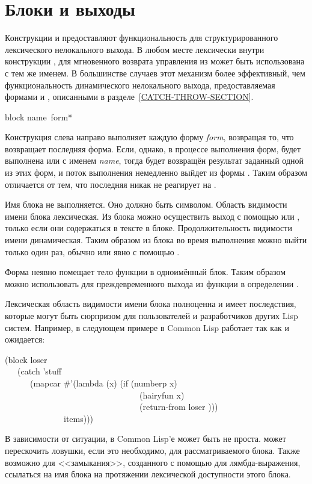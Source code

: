 \section{Блоки и выходы}
\label{BLOCK-RETURN-SECTION}

Конструкции  и  предоставляют функциональность для
структурированного лексического нелокального выхода. В любом месте лексически
внутри конструкции , для мгновенного возврата управления из
 может быть использована  с тем же именем.
В большинстве случаев этот механизм более эффективный, чем функциональность
динамического нелокального выхода, предоставляемая формами  и
, описанными в разделе~\ref{CATCH-THROW-SECTION}.

\begin{defspec}
block name {\,form}*

Конструкция  слева направо выполняет каждую форму \emph{form},
возвращая то, что возвращает последняя форма.
Если, однако, в процессе выполнения форм, будет выполнена  или
 с именем \emph{name}, тогда будет возвращён результат заданный
одной из этих форм, и поток выполнения немедленно выйдет из формы .
Таким образом  отличается от  тем, что последняя никак не
реагирует на .

Имя блока не выполняется. Оно должно быть символом.
Область видимости имени блока лексическая. Из блока можно осуществить выход с
помощью  или , только если они содержаться в тексте
в блоке. Продолжительность видимости имени динамическая.
Таким образом из блока во время выполнения можно выйти только один раз, обычно
или явно с помощью .

Форма  неявно помещает тело функции в одноимённый блок. 
Таким образом можно использовать  для преждевременного выхода
из функции в определении .

Лексическая область видимости имени блока полноценна и имеет последствия,
которые могут быть сюрпризом для пользователей и разработчиков других Lisp
систем.
Например,  в следующем примере в Common Lisp работает так как
и ожидается:
\begin{lisp}
(block loser \\
~~~(catch 'stuff \\
~~~~~~(mapcar \#'(lambda (x) (if (numberp x) \\
~~~~~~~~~~~~~~~~~~~~~~~~~~~~~~~~(hairyfun x) \\
~~~~~~~~~~~~~~~~~~~~~~~~~~~~~~~~(return-from loser {\nil}))) \\
~~~~~~~~~~~~~~items)))
\end{lisp}
В зависимости от ситуации,  в Common Lisp'е может быть не проста.
 может перескочить ловушки, если это необходимо, для
рассматриваемого блока.
Также возможно для <<замыкания>>, созданного с помощью  для
лямбда-выражения, ссылаться на имя блока на протяжении лексической доступности
этого блока.
\end{defspec}

